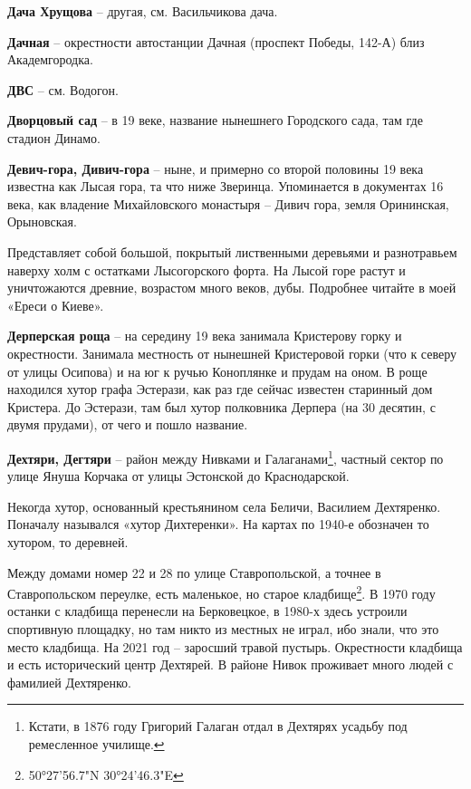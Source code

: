 \newpage

\textbf{Дача Хрущова} – другая, см. Васильчикова дача.\\

\medskip


\textbf{Дачная} – окрестности автостанции Дачная (проспект Победы, 142-А) близ Академгородка.\\

\medskip

\textbf{ДВС} – см. Водогон.\\

\medskip

\textbf{Дворцовый сад} – в 19 веке, название нынешнего Городского сада, там где стадион Динамо.\\

\medskip

\textbf{Девич-гора, Дивич-гора} – ныне, и примерно со второй половины 19 века известна как Лысая гора, та что ниже Зверинца. Упоминается в документах 16 века, как владение Михайловского монастыря – Дивич гора, земля Орининская, Орыновская.

Представляет собой большой, покрытый лис\-твенными деревьями и разнотравьем наверху холм с остатками Лысогорского форта. На Лысой горе растут и уничтожаются древние, возрастом много веков, дубы. Подробнее читайте в моей «Ереси о Киеве».\\

\medskip

\textbf{Дерперская роща} – на середину 19 века занимала Кристерову горку и окрестности. Занимала местность от нынешней Кристеровой горки (что к северу от улицы Осипова) и на юг к ручью Коноплянке и прудам на оном. В роще находился хутор графа Эстерази, как раз где сейчас известен старинный дом Кристера. До Эстерази, там был хутор полковника Дерпера (на 30 десятин, с двумя прудами), от чего и пошло название.\\

\medskip

\textbf{Дехтяри, Дегтяри} – район между Нивками и Галаганами\footnote{Кстати, в 1876 году Григорий Галаган отдал в Дехтярях усадьбу под ремесленное училище.}, частный сектор по улице Януша Корчака от улицы Эстонской до Краснодарской. 

Некогда хутор, основанный крестьянином села Беличи, Василием Дехтяренко. Поначалу назывался «хутор Дихтеренки». На картах по 1940-е обозначен то хутором, то деревней.

Между домами номер 22 и 28 по улице Ставропольской, а точнее в Ставропольском переулке, есть маленькое, но старое кладбище\footnote{50°27'56.7"N 30°24'46.3"E}. В 1970 году останки с кладбища перенесли на Берковецкое, в 1980-х здесь устроили спортивную площадку, но там никто из местных не играл, ибо знали, что это место кладбища. На 2021 год – заросший травой пустырь. Окрестности кладбища и есть исторический центр Дехтярей. В районе Нивок проживает много людей с фамилией Дехтяренко.\\

